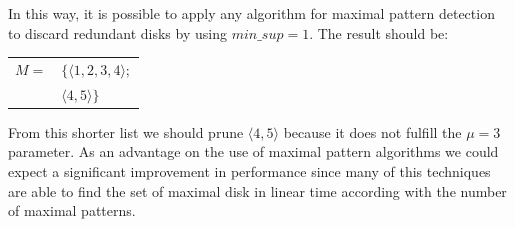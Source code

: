 \documentclass[10pt]{scrartcl}
\begin{document}
In this way, it is possible to apply any algorithm for maximal pattern detection to discard redundant disks by using $min\_sup=1$.  The result should be:

\vspace{2mm}
\begin{tabular}{r l}
$M =$ 	& $\{ \langle 1, 2, 3, 4 \rangle; $\\
	& $   \langle 4, 5 \rangle \} $	\\
\end{tabular}
\vspace{2mm}

From this shorter list we should prune $\langle 4, 5 \rangle$ because it does not fulfill the $\mu = 3$ parameter. As an advantage on the use of maximal pattern algorithms we could expect a significant improvement in performance since many of this techniques are able to find the set of maximal disk in linear time according with the number of maximal patterns. 
    
\end{document}
